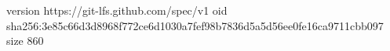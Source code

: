 version https://git-lfs.github.com/spec/v1
oid sha256:3e85c66d3d8968f772ce6d1030a7fef98b7836d5a5d56ee0fe16ca9711cbb097
size 860
